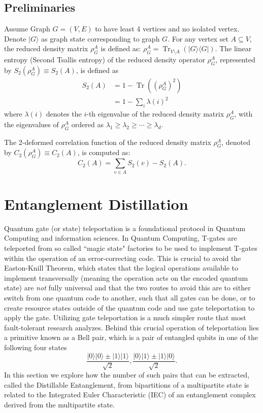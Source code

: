 \documentclass{article}
\DeclareMathOperator{\Tr}{Tr}
\newcommand{\ket}[1]{|#1\rangle}
\newcommand{\bra}[1]{\langle #1|}
\begin{document}
\subsection{Preliminaries}
Assume Graph $G = (V, E)$ to have least 4 vertices and no isolated vertex. Denote $\ket{G}$ as graph state corresponding to graph $G$. For any vertex set $A \subseteq V$, the reduced density matrix $ \rho^A_G $ is defined as:
$
\rho^A_G = \Tr_{V \setminus A} \left( \ket{G} \bra{G} \right)
$. 
The linear entropy (Second Tsallis entropy) of the reduced density operator $\rho^A_G$, represented by $S_2(\rho^A_G) \equiv S_2(A)$, is defined as
\begin{align} \label{eq:linear_entropy}
S_2(A) &= 1 - \Tr\left((\rho^A_G)^2\right) \\
       &= 1 - \sum_{i} \lambda(i)^2  
\end{align}
where \( \lambda(i) \) denotes the \( i \)-th eigenvalue of the reduced density matrix \( \rho^A_G \), with the eigenvalues of \( \rho^A_G \) ordered as \( \lambda_1 \geq \lambda_2 \geq \cdots \geq \lambda_d \).

The 2-deformed correlation function of the reduced density matrix $\rho^A_G $, denoted by $ C_2(\rho^A_G) \equiv C_2(A)$, is computed as:
\begin{equation}
\label{eq:correlation_function}
C_2(A)  = \sum_{v \in A} S_2(v) - S_2(A).    
\end{equation}


\section{Entanglement Distillation} \label{sec:distillable_entanglement}
Quantum gate (or state) teleportation is a foundational protocol in Quantum Computing and information sciences. In Quantum Computing, T-gates are teleported from so called ``magic state" factories to be used to implement T-gates within the operation of an error-correcting code. This is crucial to avoid the Easton-Knill Theorem, which states that the logical operations available to implement transversally (meaning the operation acts on the encoded quantum state) are \emph{not} fully universal and that the two routes to avoid this are to either switch from one quantum code to another, such that all gates can be done, or to create resource states outside of the quantum code and use gate teleportation to apply the gate. Utilizing gate teleportation is a much simpler route that most fault-tolerant research analyzes. Behind this crucial operation of teleportation lies a  primitive known as a Bell pair, which is a pair of entangled qubits in one of the following four states
\begin{equation}
    \frac{\ket{0}\ket{0} \pm \ket{1}\ket{1}}{\sqrt{2}}, \frac{\ket{0}\ket{1} \pm \ket{1}\ket{0}}{\sqrt{2}}. 
\end{equation}
In this section we explore how the number of such pairs that can be extracted, called the Distillable Entanglement, from bipartitions of a multipartite state is related to the Integrated Euler Characteristic (IEC) of an entanglement complex derived from the multipartite state.
\end{document}

